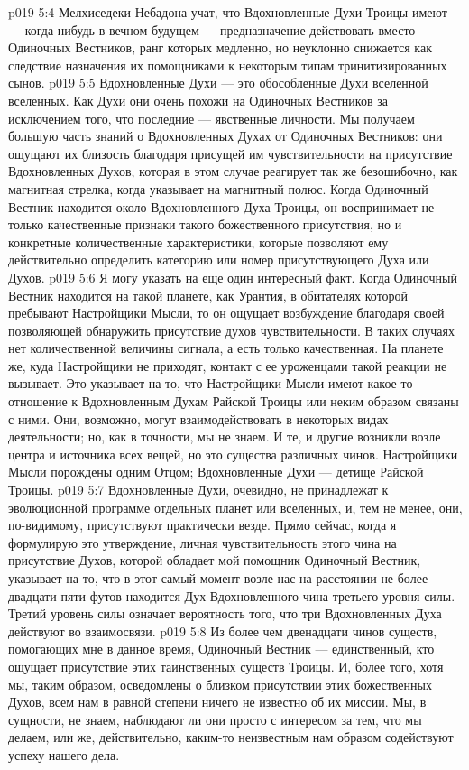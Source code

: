 \vs p019 5:4 Мелхиседеки Небадона учат, что Вдохновленные Духи Троицы имеют --- когда\hyp{}нибудь в вечном будущем --- предназначение действовать вместо Одиночных Вестников, ранг которых медленно, но неуклонно снижается как следствие назначения их помощниками к некоторым типам тринитизированных сынов.
\vs p019 5:5 \pc Вдохновленные Духи --- это обособленные Духи вселенной вселенных. Как Духи они очень похожи на Одиночных Вестников за исключением того, что последние --- явственные личности. Мы получаем большую часть знаний о Вдохновленных Духах от Одиночных Вестников: они ощущают их близость благодаря присущей им чувствительности на присутствие Вдохновленных Духов, которая в этом случае реагирует так же безошибочно, как магнитная стрелка, когда указывает на магнитный полюс. Когда Одиночный Вестник находится около Вдохновленного Духа Троицы, он воспринимает не только качественные признаки такого божественного присутствия, но и конкретные количественные характеристики, которые позволяют ему действительно определить категорию или номер присутствующего Духа или Духов.
\vs p019 5:6 Я могу указать на еще один интересный факт. Когда Одиночный Вестник находится на такой планете, как Урантия, в обитателях которой пребывают Настройщики Мысли, то он ощущает возбуждение благодаря своей позволяющей обнаружить присутствие духов чувствительности. В таких случаях нет количественной величины сигнала, а есть только качественная. На планете же, куда Настройщики не приходят, контакт с ее уроженцами такой реакции не вызывает. Это указывает на то, что Настройщики Мысли имеют какое\hyp{}то отношение к Вдохновленным Духам Райской Троицы или неким образом связаны с ними. Они, возможно, могут взаимодействовать в некоторых видах деятельности; но, как в точности, мы не знаем. И те, и другие возникли возле центра и источника всех вещей, но это существа различных чинов. Настройщики Мысли порождены одним Отцом; Вдохновленные Духи --- детище Райской Троицы.
\vs p019 5:7 Вдохновленные Духи, очевидно, не принадлежат к эволюционной программе отдельных планет или вселенных, и, тем не менее, они, по\hyp{}видимому, присутствуют практически везде. Прямо сейчас, когда я формулирую это утверждение, личная чувствительность этого чина на присутствие Духов, которой обладает мой помощник Одиночный Вестник, указывает на то, что в этот самый момент возле нас на расстоянии не более двадцати пяти футов находится Дух Вдохновленного чина третьего уровня силы. Третий уровень силы означает вероятность того, что три Вдохновленных Духа действуют во взаимосвязи.
\vs p019 5:8 \pc Из более чем двенадцати чинов существ, помогающих мне в данное время, Одиночный Вестник --- единственный, кто ощущает присутствие этих таинственных существ Троицы. И, более того, хотя мы, таким образом, осведомлены о близком присутствии этих божественных Духов, всем нам в равной степени ничего не известно об их миссии. Мы, в сущности, не знаем, наблюдают ли они просто с интересом за тем, что мы делаем, или же, действительно, каким\hyp{}то неизвестным нам образом содействуют успеху нашего дела.
